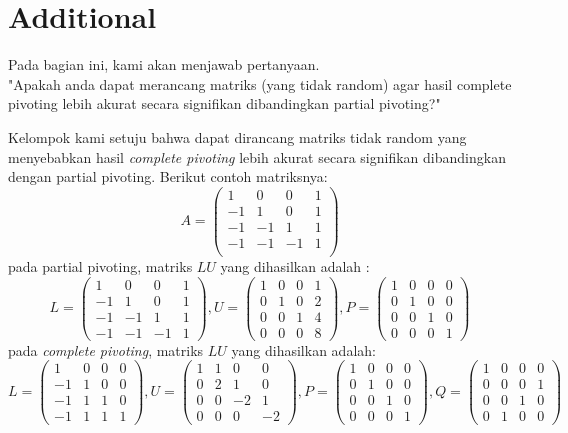 \documentclass[11pt]{article}
\begin{document}
\section{Additional}
Pada bagian ini, kami akan menjawab pertanyaan.
\\
"Apakah anda dapat merancang matriks (yang tidak random) agar hasil complete pivoting lebih akurat secara signifikan dibandingkan partial pivoting?"

Kelompok kami setuju bahwa dapat dirancang matriks tidak random yang menyebabkan hasil \textit{complete pivoting} lebih akurat secara signifikan dibandingkan dengan partial pivoting. Berikut contoh matriksnya:
\[
A = \begin{pmatrix}
   1 & 0 & 0 & 1 \\
  -1 & 1 & 0 & 1 \\
  -1 & -1 & 1 & 1 \\
  -1 & -1 & -1 & 1 \\
\end{pmatrix}
\]
pada partial pivoting, matriks $LU$ yang dihasilkan adalah :
\[
L = \begin{pmatrix}
   1 & 0 & 0 & 1 \\
  -1 & 1 & 0 & 1 \\
  -1 & -1 & 1 & 1 \\
  -1 & -1 & -1 & 1
\end{pmatrix}
, U = \begin{pmatrix}
 1 & 0 & 0 & 1 \\
 0 & 1 & 0 & 2 \\
 0 & 0 & 1 & 4 \\ 
 0 &  0 &  0 & 8 
\end{pmatrix}
, P = \begin{pmatrix}
1 & 0 & 0 & 0 \\
0 & 1 & 0 & 0 \\
0 & 0 & 1 & 0 \\
0 & 0 & 0 & 1 
\end{pmatrix}
\]
pada \textit{complete pivoting}, matriks $LU$ yang dihasilkan adalah:
\[
L = \begin{pmatrix}
 1 & 0 &  0 & 0\\
-1 & 1 & 0 & 0\\
-1 & 1 & 1 & 0\\
-1 & 1 & 1 & 1
\end{pmatrix}
, U = \begin{pmatrix}
  1 & 1 & 0 &  0 \\
  0 & 2 & 1 & 0\\
  0 & 0 & -2 & 1\\
  0 & 0 & 0 & -2
\end{pmatrix}
, P = \begin{pmatrix}
1 & 0 & 0 & 0 \\
0 & 1 & 0 & 0 \\
0 & 0 & 1 & 0 \\
0 & 0 & 0 & 1 
\end{pmatrix}
, Q = \begin{pmatrix}
1 & 0 & 0 & 0 \\
0 & 0 & 0 & 1 \\
0 & 0 & 1 & 0 \\
0 & 1 & 0 & 0 
\end{pmatrix}
\]
\end{document}
